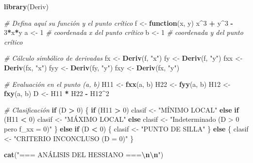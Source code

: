 \documentclass[
]{book}
\newenvironment{Shaded}{\begin{snugshade}}{\end{snugshade}}
\newcommand{\CommentTok}[1]{\textcolor[rgb]{0.56,0.35,0.01}{\textit{#1}}}
\newcommand{\ControlFlowTok}[1]{\textcolor[rgb]{0.13,0.29,0.53}{\textbf{#1}}}
\newcommand{\DecValTok}[1]{\textcolor[rgb]{0.00,0.00,0.81}{#1}}
\newcommand{\FunctionTok}[1]{\textcolor[rgb]{0.13,0.29,0.53}{\textbf{#1}}}
\newcommand{\NormalTok}[1]{#1}
\newcommand{\OtherTok}[1]{\textcolor[rgb]{0.56,0.35,0.01}{#1}}
\newcommand{\SpecialCharTok}[1]{\textcolor[rgb]{0.81,0.36,0.00}{\textbf{#1}}}
\newcommand{\StringTok}[1]{\textcolor[rgb]{0.31,0.60,0.02}{#1}}
\begin{document}
\begin{Shaded}
\begin{Highlighting}[]
\FunctionTok{library}\NormalTok{(Deriv)}

\CommentTok{\# Defina aquí su función y el punto crítico}
\NormalTok{f }\OtherTok{\textless{}{-}} \ControlFlowTok{function}\NormalTok{(x, y) x}\SpecialCharTok{\^{}}\DecValTok{3} \SpecialCharTok{+}\NormalTok{ y}\SpecialCharTok{\^{}}\DecValTok{3} \SpecialCharTok{{-}} \DecValTok{3}\SpecialCharTok{*}\NormalTok{x}\SpecialCharTok{*}\NormalTok{y}
\NormalTok{a }\OtherTok{\textless{}{-}} \DecValTok{1}  \CommentTok{\# coordenada x del punto crítico}
\NormalTok{b }\OtherTok{\textless{}{-}} \DecValTok{1}  \CommentTok{\# coordenada y del punto crítico}

\CommentTok{\# Cálculo simbólico de derivadas}
\NormalTok{fx }\OtherTok{\textless{}{-}} \FunctionTok{Deriv}\NormalTok{(f, }\StringTok{"x"}\NormalTok{)}
\NormalTok{fy }\OtherTok{\textless{}{-}} \FunctionTok{Deriv}\NormalTok{(f, }\StringTok{"y"}\NormalTok{)}
\NormalTok{fxx }\OtherTok{\textless{}{-}} \FunctionTok{Deriv}\NormalTok{(fx, }\StringTok{"x"}\NormalTok{)}
\NormalTok{fyy }\OtherTok{\textless{}{-}} \FunctionTok{Deriv}\NormalTok{(fy, }\StringTok{"y"}\NormalTok{)}
\NormalTok{fxy }\OtherTok{\textless{}{-}} \FunctionTok{Deriv}\NormalTok{(fx, }\StringTok{"y"}\NormalTok{)}

\CommentTok{\# Evaluación en el punto (a, b)}
\NormalTok{H11 }\OtherTok{\textless{}{-}} \FunctionTok{fxx}\NormalTok{(a, b)}
\NormalTok{H22 }\OtherTok{\textless{}{-}} \FunctionTok{fyy}\NormalTok{(a, b)}
\NormalTok{H12 }\OtherTok{\textless{}{-}} \FunctionTok{fxy}\NormalTok{(a, b)}
\NormalTok{D }\OtherTok{\textless{}{-}}\NormalTok{ H11 }\SpecialCharTok{*}\NormalTok{ H22 }\SpecialCharTok{{-}}\NormalTok{ H12}\SpecialCharTok{\^{}}\DecValTok{2}

\CommentTok{\# Clasificación}
\ControlFlowTok{if}\NormalTok{ (D }\SpecialCharTok{\textgreater{}} \DecValTok{0}\NormalTok{) \{}
  \ControlFlowTok{if}\NormalTok{ (H11 }\SpecialCharTok{\textgreater{}} \DecValTok{0}\NormalTok{) clasif }\OtherTok{\textless{}{-}} \StringTok{"MÍNIMO LOCAL"}
  \ControlFlowTok{else} \ControlFlowTok{if}\NormalTok{ (H11 }\SpecialCharTok{\textless{}} \DecValTok{0}\NormalTok{) clasif }\OtherTok{\textless{}{-}} \StringTok{"MÁXIMO LOCAL"}
  \ControlFlowTok{else}\NormalTok{ clasif }\OtherTok{\textless{}{-}} \StringTok{"Indeterminado (D \textgreater{} 0 pero f\_xx = 0)"}
\NormalTok{\} }\ControlFlowTok{else} \ControlFlowTok{if}\NormalTok{ (D }\SpecialCharTok{\textless{}} \DecValTok{0}\NormalTok{) \{}
\NormalTok{  clasif }\OtherTok{\textless{}{-}} \StringTok{"PUNTO DE SILLA"}
\NormalTok{\} }\ControlFlowTok{else}\NormalTok{ \{}
\NormalTok{  clasif }\OtherTok{\textless{}{-}} \StringTok{"CRITERIO INCONCLUSO (D = 0)"}
\NormalTok{\}}

\FunctionTok{cat}\NormalTok{(}\StringTok{"=== ANÁLISIS DEL HESSIANO ===}\SpecialCharTok{\textbackslash{}n\textbackslash{}n}\StringTok{"}\NormalTok{)}
\end{Highlighting}
\end{Shaded}
\end{document}
